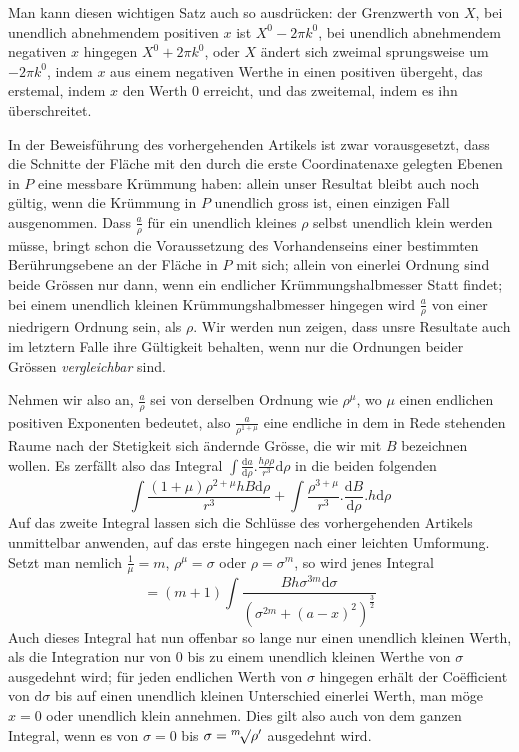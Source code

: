 %
Man kann diesen wichtigen Satz auch so ausdrücken: der Grenzwerth von $X$, bei unendlich abnehmendem positiven $x$ ist $X^0-2\pi k^0$, bei unendlich abnehmendem negativen $x$ hingegen $X^0+2\pi k^0$, oder $X$ ändert sich zweimal sprungsweise um $-2\pi k^0$, indem $x$ aus einem negativen Werthe in einen positiven übergeht, das erstemal, indem $x$ den Werth $0$ erreicht, und das zweitemal, indem es ihn überschreitet.

In der Beweisführung des vorhergehenden Artikels ist zwar vorausgesetzt, dass die Schnitte der Fläche mit den durch die erste Coordinatenaxe gelegten Ebenen in $P$ eine messbare Krümmung haben: allein unser Resultat bleibt auch noch gültig, wenn die Krümmung in $P$ unendlich gross ist, einen einzigen Fall ausgenommen. Dass $\frac a\rho$ für ein unendlich kleines $\rho$ selbst unendlich klein werden müsse, bringt schon die Voraussetzung des Vorhandenseins einer bestimmten Berührungsebene an der Fläche in $P$ mit sich; allein von einerlei Ordnung sind beide Grössen nur dann, wenn ein endlicher Krümmungshalbmesser Statt findet; bei einem unendlich kleinen Krümmungshalbmesser hingegen wird $\frac a\rho$ von einer niedrigern Ordnung sein, als $\rho$. Wir werden nun zeigen, dass unsre Resultate auch im letztern Falle ihre Gültigkeit behalten, wenn nur die Ordnungen beider Grössen \textit{vergleichbar} sind.

Nehmen wir also an, $\frac a\rho$ sei von derselben Ordnung wie $\rho^\mu$, wo $\mu$ einen endlichen positiven Exponenten bedeutet, also $\frac{a}{\rho^{1+\mu}}$ eine endliche in dem in Rede stehenden Raume nach der Stetigkeit sich ändernde Grösse, die wir mit $B$ bezeichnen wollen. Es zerfällt also das Integral $\int\frac{\mathrm da}{\mathrm d\rho}.\frac{h\rho\rho}{r^3}\mathrm d\rho$ in die beiden folgenden
\[
\int\frac{(1+\mu)\rho^{2+\mu}hB\mathrm d\rho}{r^3}+\int\frac{\rho^{3+\mu}}{r^3}.\frac{\mathrm dB}{\mathrm d\rho}.h\mathrm d\rho
\]
Auf das zweite Integral lassen sich die Schlüsse des vorhergehenden Artikels unmittelbar anwenden, auf das erste hingegen nach einer leichten Umformung. Setzt man nemlich $\frac1\mu=m$, $\rho^\mu=\sigma$ oder $\rho=\sigma^m$, so wird jenes Integral
\[
=(m+1)\int\frac{Bh\sigma^{3m}\mathrm d\sigma}{(\sigma^{2m}+(a-x)^2)^{\frac32}}
\]
Auch dieses Integral hat nun offenbar so lange nur einen unendlich kleinen Werth, als die Integration nur von $0$ bis zu einem unendlich kleinen Werthe von $\sigma$ ausgedehnt wird; für jeden endlichen Werth von $\sigma$ hingegen erhält der Coëfficient
%
von $\mathrm d\sigma$ bis auf einen unendlich kleinen Unterschied einerlei Werth, man möge $x=0$ oder unendlich klein annehmen. Dies gilt also auch von dem ganzen Integral, wenn es von $\sigma=0$ bis $\sigma=\BareRoot[m]{\rho'}$ ausgedehnt wird.

